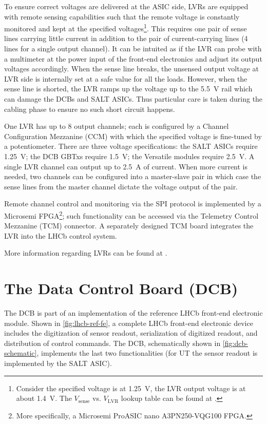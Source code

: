 To ensure correct voltages are delivered at the ASIC side,
LVRs are equipped with remote sensing capabilities such that the
remote voltage is constantly monitored and kept at the specified
voltages\footnote{
    Consider the specified voltage is at 1.25~V, the LVR output voltage is
    at about 1.4~V.
    The $V_\text{sense}$ vs. $V_\text{LVR}$ lookup table can be found at
    \cite{LVR_output_voltage_lookup}.
}.
This requires one pair of sense lines carrying little current in addition to
the pair of current-carrying lines (4 lines for a single output channel).
It can be intuited as if the LVR can probe with a multimeter at the power input
of the front-end electronics and adjust its output voltages accordingly.
When the sense line breaks, the unsensed output voltage at LVR side is
internally set at a safe value for all the loads.
However, when the sense line is shorted, the LVR ramps up the voltage
up to the 5.5~V rail which can damage the DCBs and SALT ASICs.
Thus particular care is taken during the cabling phase to ensure no such short
circuit happens.

One LVR has up to 8 output channels;
each is configured by a Channel Configuration Mezzanine (CCM) with which the
specified voltage is fine-tuned by a potentiometer.
There are three voltage specifications:
the SALT ASICs require 1.25~V;
the DCB GBTxs require 1.5~V;
the Versatile modules require 2.5~V.
A single LVR channel can output up to 2.5~A of current.
When more current is needed, two channels can be configured into a master-slave
pair in which case the sense lines from the master channel dictate the voltage
output of the pair.

Remote channel control and monitoring via the SPI protocol is implemented
by a Microsemi FPGA\footnote{
    More specifically, a Microsemi ProASIC nano A3PN250-VQG100 FPGA.
};
such functionality can be accessed via the Telemetry Control Mezzanine (TCM)
connector.
A separately designed TCM board integrates the LVR into the LHCb control system.

More information regarding LVRs can be found at \cite{LVR_manual}.


\section{The Data Control Board (DCB)}
\label{ref:ut:dcb}

The DCB is part of an implementation of the reference LHCb front-end electronic
module.
Shown in \cref{fig:lhcb-ref-fe},
a complete LHCb front-end electronic device includes the digitization of sensor
readout, serialization of digitized readout, and distribution of control
commands.
The DCB,
schematically shown in \cref{fig:dcb-schematic},
implements the last two functionalities (for UT the sensor readout is implemented
by the SALT ASIC).

